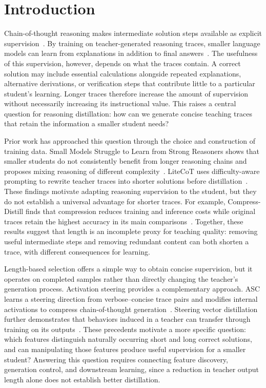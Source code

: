 \section{Introduction}
\label{sec:introduction}

Chain-of-thought reasoning makes intermediate solution steps available as explicit supervision~\citep{wei2022chain}.
By training on teacher-generated reasoning traces, smaller language models can learn from explanations in addition to final answers~\citep{hsieh2023distilling}.
The usefulness of this supervision, however, depends on what the traces contain.
A correct solution may include essential calculations alongside repeated explanations, alternative derivations, or verification steps that contribute little to a particular student's learning.
Longer traces therefore increase the amount of supervision without necessarily increasing its instructional value.
This raises a central question for reasoning distillation: how can we generate concise teaching traces that retain the information a smaller student needs?

Prior work has approached this question through the choice and construction of training data.
Small Models Struggle to Learn from Strong Reasoners shows that smaller students do not consistently benefit from longer reasoning chains and proposes mixing reasoning of different complexity~\citep{li2025small}.
LiteCoT uses difficulty-aware prompting to rewrite teacher traces into shorter solutions before distillation~\citep{wu2025concise}.
These findings motivate adapting reasoning supervision to the student, but they do not establish a universal advantage for shorter traces.
For example, Compress-Distill finds that compression reduces training and inference costs while original traces retain the highest accuracy in its main comparisons~\citep{griot2026compress}.
Together, these results suggest that length is an incomplete proxy for teaching quality: removing useful intermediate steps and removing redundant content can both shorten a trace, with different consequences for learning.

Length-based selection offers a simple way to obtain concise supervision, but it operates on completed samples rather than directly changing the teacher's generation process.
Activation steering provides a complementary approach.
ASC learns a steering direction from verbose--concise trace pairs and modifies internal activations to compress chain-of-thought generation~\citep{azizi2026activation}.
Steering vector distillation further demonstrates that behaviors induced in a teacher can transfer through training on its outputs~\citep{blank2026subliminal}.
These precedents motivate a more specific question: which features distinguish naturally occurring short and long correct solutions, and can manipulating those features produce useful supervision for a smaller student?
Answering this question requires connecting feature discovery, generation control, and downstream learning, since a reduction in teacher output length alone does not establish better distillation.

